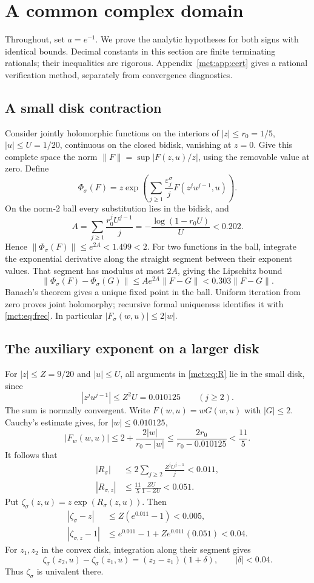 \documentclass[11pt]{article}
\theoremstyle{definition}
\newcommand{\eps}{\varepsilon}
\begin{document}
\section{A common complex domain}\label{mct:sec:domain}
Throughout, set $a=e^{-1}$. We prove the analytic hypotheses for both signs with identical bounds. Decimal constants in this section are finite terminating rationals; their inequalities are rigorous. Appendix~\ref{mct:app:cert} gives a rational verification method, separately from convergence diagnostics.

\subsection{A small disk contraction}
Consider jointly holomorphic functions on the interiors of $|z|\le r_0=1/5$, $|u|\le U=1/20$, continuous on the closed bidisk, vanishing at $z=0$. Give this complete space the norm $\|F\|=\sup|F(z,u)/z|$, using the removable value at zero. Define
\[
 \Phi_\sigma(F)=z\exp\left(\sum_{j\ge1}\frac{\eps_j^\sigma}{j}
 F(z^ju^{j-1},u)\right).
\]
On the norm-$2$ ball every substitution lies in the bidisk, and
\[
 A=\sum_{j\ge1}\frac{r_0^jU^{j-1}}j
   =-\frac{\log(1-r_0U)}U<0.202.
\]
Hence $\|\Phi_\sigma(F)\|\le e^{2A}<1.499<2$. For two functions in the ball, integrate the exponential derivative along the straight segment between their exponent values. That segment has modulus at most $2A$, giving the Lipschitz bound
\[
 \|\Phi_\sigma(F)-\Phi_\sigma(G)\|
 \le A e^{2A}\|F-G\|<0.303\|F-G\|.
\]
Banach's theorem gives a unique fixed point in the ball. Uniform iteration from zero proves joint holomorphy; recursive formal uniqueness identifies it with \eqref{mct:eq:frec}. In particular $|F_\sigma(w,u)|\le2|w|$.

\subsection{The auxiliary exponent on a larger disk}
For $|z|\le Z=9/20$ and $|u|\le U$, all arguments in \eqref{mct:eq:R} lie in the small disk, since
\[
 |z^ju^{j-1}|\le Z^2U=0.010125\qquad(j\ge2).
\]
The sum is normally convergent. Write $F(w,u)=wG(w,u)$ with $|G|\le2$. Cauchy's estimate gives, for $|w|\le0.010125$,
\[
 |F_w(w,u)|\le2+\frac{2|w|}{r_0-|w|}
 \le\frac{2r_0}{r_0-0.010125}<\frac{11}{5}.
\]
It follows that
\begin{align}
 |R_\sigma|&\le2\sum_{j\ge2}\frac{Z^jU^{j-1}}j<0.011,\label{mct:eq:Rbound}\\
 |R_{\sigma,z}|&\le\frac{11}{5}\frac{ZU}{1-ZU}<0.051.
\end{align}
Put $\zeta_\sigma(z,u)=z\exp(R_\sigma(z,u))$. Then
\begin{align}
 |\zeta_\sigma-z|&\le Z(e^{0.011}-1)<0.005,\label{mct:eq:zetabounds}\\
 |\zeta_{\sigma,z}-1|&\le e^{0.011}-1+Ze^{0.011}(0.051)<0.04.
\end{align}
For $z_1,z_2$ in the convex disk, integration along their segment gives
\begin{equation}\label{mct:eq:deltageometry}
 \zeta_\sigma(z_2,u)-\zeta_\sigma(z_1,u)
  =(z_2-z_1)(1+\delta),\qquad |\delta|<0.04.
\end{equation}
Thus $\zeta_\sigma$ is univalent there.
\end{document}
